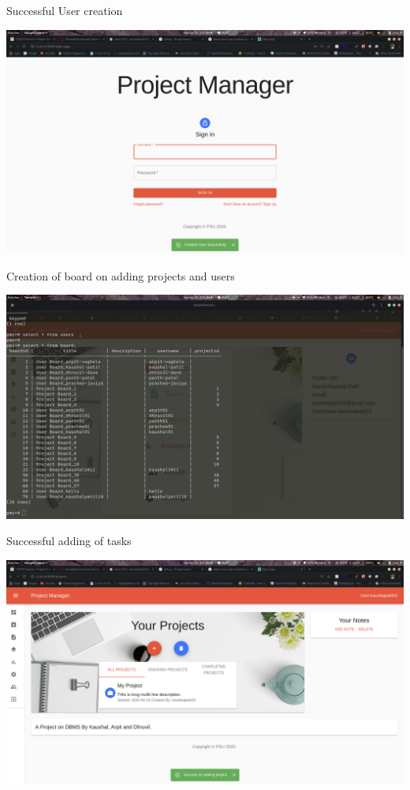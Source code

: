 \documentclass[conference,onecolumn]{IEEEtran}
\begin{document}
Successful User creation

\includegraphics[scale=0.25]{./1.png}

Creation of board on adding projects and users

\includegraphics[scale=0.25]{./2.png}

Successful adding of tasks

\includegraphics[scale=0.25]{./3.png}
\end{document}
